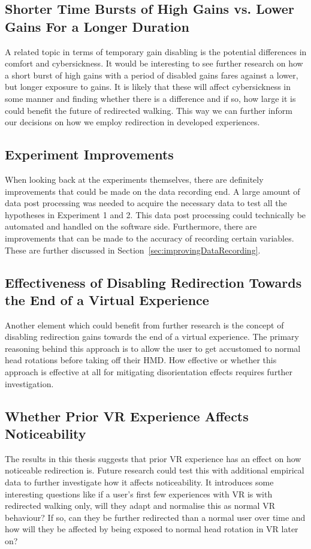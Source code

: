 \subsection{Shorter Time Bursts of High Gains vs. Lower Gains For a Longer Duration}
A related topic in terms of temporary gain disabling is the potential differences in comfort and cybersickness. It would be interesting to see further research on how a short burst of high gains with a period of disabled gains fares against a lower, but longer exposure to gains. It is likely that these will affect cybersickness in some manner and finding whether there is a difference and if so, how large it is could benefit the future of redirected walking. This way we can further inform our decisions on how we employ redirection in developed experiences.

\subsection{Experiment Improvements}
When looking back at the experiments themselves, there are definitely improvements that could be made on the data recording end. A large amount of data post processing was needed to acquire the necessary data to test all the hypotheses in Experiment 1 and 2. This data post processing could technically be automated and handled on the software side. Furthermore, there are improvements that can be made to the accuracy of recording certain variables. These are further discussed in Section~\ref{sec:improvingDataRecording}. 

\subsection{Effectiveness of Disabling Redirection Towards the End of a Virtual Experience}
Another element which could benefit from further research is the concept of disabling redirection gains towards the end of a virtual experience. The primary reasoning behind this approach is to allow the user to get accustomed to normal head rotations before taking off their HMD. How effective or whether this approach is effective at all for mitigating disorientation effects requires further investigation.
  
\subsection{Whether Prior VR Experience Affects Noticeability}
The results in this thesis suggests that prior VR experience has an effect on how noticeable redirection is. Future research could test this with additional empirical data to further investigate how it affects noticeability. It introduces some interesting questions like if a user's first few experiences with VR is with redirected walking only, will they adapt and normalise this as normal VR behaviour? If so, can they be further redirected than a normal user over time and how will they be affected by being exposed to normal head rotation in VR later on?

